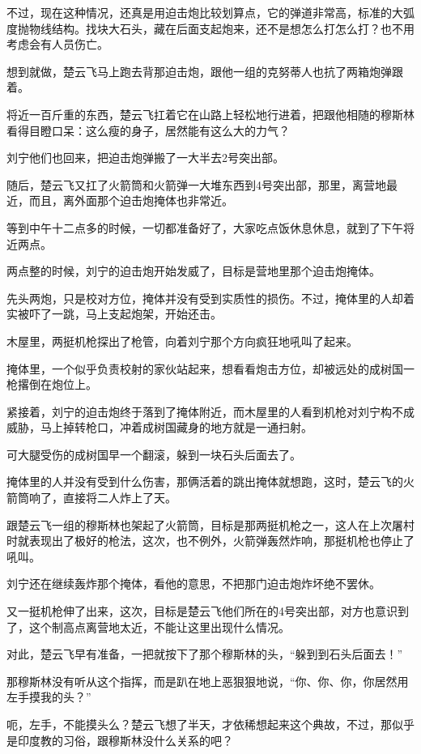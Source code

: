 不过，现在这种情况，还真是用迫击炮比较划算点，它的弹道非常高，标准的大弧度抛物线结构。找块大石头，藏在后面支起炮来，还不是想怎么打怎么打？也不用考虑会有人员伤亡。

想到就做，楚云飞马上跑去背那迫击炮，跟他一组的克努蒂人也抗了两箱炮弹跟着。

将近一百斤重的东西，楚云飞扛着它在山路上轻松地行进着，把跟他相随的穆斯林看得目瞪口呆：这么瘦的身子，居然能有这么大的力气？

刘宁他们也回来，把迫击炮弹搬了一大半去2号突出部。

随后，楚云飞又扛了火箭筒和火箭弹一大堆东西到4号突出部，那里，离营地最近，而且，离外面那个迫击炮掩体也非常近。

等到中午十二点多的时候，一切都准备好了，大家吃点饭休息休息，就到了下午将近两点。

两点整的时候，刘宁的迫击炮开始发威了，目标是营地里那个迫击炮掩体。

先头两炮，只是校对方位，掩体并没有受到实质性的损伤。不过，掩体里的人却着实被吓了一跳，马上支起炮架，开始还击。

木屋里，两挺机枪探出了枪管，向着刘宁那个方向疯狂地吼叫了起来。

掩体里，一个似乎负责校射的家伙站起来，想看看炮击方位，却被远处的成树国一枪撂倒在炮位上。

紧接着，刘宁的迫击炮终于落到了掩体附近，而木屋里的人看到机枪对刘宁构不成威胁，马上掉转枪口，冲着成树国藏身的地方就是一通扫射。

可大腿受伤的成树国早一个翻滚，躲到一块石头后面去了。

掩体里的人并没有受到什么伤害，那俩活着的跳出掩体就想跑，这时，楚云飞的火箭筒响了，直接将二人炸上了天。

跟楚云飞一组的穆斯林也架起了火箭筒，目标是那两挺机枪之一，这人在上次屠村时就表现出了极好的枪法，这次，也不例外，火箭弹轰然炸响，那挺机枪也停止了吼叫。

刘宁还在继续轰炸那个掩体，看他的意思，不把那门迫击炮炸坏绝不罢休。

又一挺机枪伸了出来，这次，目标是楚云飞他们所在的4号突出部，对方也意识到了，这个制高点离营地太近，不能让这里出现什么情况。

对此，楚云飞早有准备，一把就按下了那个穆斯林的头，“躲到到石头后面去！”

那穆斯林没有听从这个指挥，而是趴在地上恶狠狠地说，“你、你、你，你居然用左手摸我的头？”

呃，左手，不能摸头么？楚云飞想了半天，才依稀想起来这个典故，不过，那似乎是印度教的习俗，跟穆斯林没什么关系的吧？

